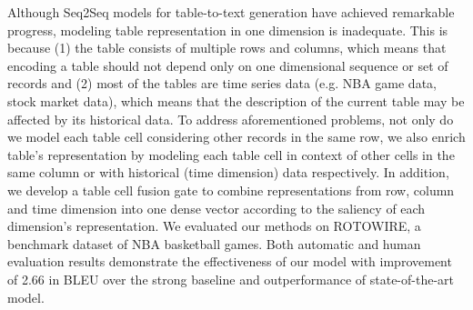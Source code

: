 Although Seq2Seq models for table-to-text generation have achieved remarkable progress, modeling table representation in one dimension is inadequate. This is because (1) the table consists of multiple rows and columns, which means that encoding a table should not depend only on one dimensional sequence or set of records and (2) most of the tables are time series data (e.g. NBA game data, stock market data), which means that the description of the current table may be affected by its historical data. To address aforementioned problems, not only do we model each table cell considering other records in the same row, we also enrich table's representation by modeling each table cell in context of other cells in the same column or with historical (time dimension) data respectively. In addition, we develop a table cell fusion gate to combine representations from row, column and time dimension into one dense vector according to the saliency of each dimension's representation. We evaluated our methods on ROTOWIRE, a benchmark dataset of NBA basketball games. Both automatic and human evaluation results demonstrate the effectiveness of our model with improvement of 2.66 in BLEU over the strong baseline and outperformance of state-of-the-art model.